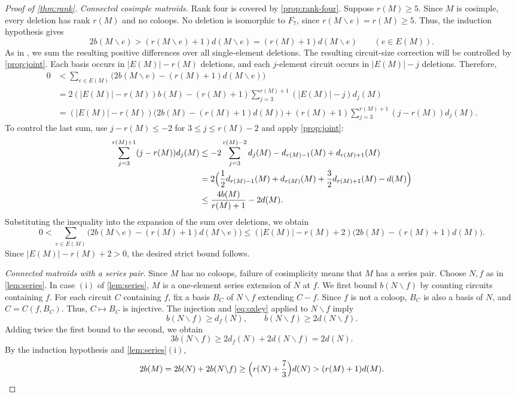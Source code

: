\documentclass[11pt]{article}
\numberwithin{equation}{section}
\begin{document}
\begin{proof}[Proof of \autoref{thm:rank}]
\emph{Connected cosimple matroids.}
Rank four is covered by \autoref{prop:rank-four}.
Suppose \(r(M)\ge5\).
Since \(M\) is cosimple, every deletion has rank \(r(M)\)
and no coloops.
No deletion is isomorphic to \(F_7\), since
\(r(M\backslash e)=r(M)\ge5\). Thus, the induction hypothesis gives
\[
 2b(M\backslash e)>(r(M\backslash e)+1)d(M\backslash e)
 =(r(M)+1)d(M\backslash e)\qquad(e\in E(M)).
\]
As in \cite[proof of Theorem~3.1, pp.~176--177]{Oxley1983},
we sum the resulting positive differences over all single-element deletions.
The resulting circuit-size correction will be controlled by
\autoref{prop:joint}.
Each basis occurs in \(|E(M)|-r(M)\) deletions, and each
\(j\)-element circuit occurs in \(|E(M)|-j\) deletions.
Therefore,
\begin{align*}
 0&<\sum_{e\in E(M)}
 \bigl(2b(M\backslash e)-(r(M)+1)d(M\backslash e)\bigr)\\
 &=2(|E(M)|-r(M))b(M)
 -(r(M)+1)\sum_{j=3}^{r(M)+1}(|E(M)|-j)d_j(M)\\
 &=(|E(M)|-r(M))\bigl(2b(M)-(r(M)+1)d(M)\bigr)+(r(M)+1)\sum_{j=3}^{r(M)+1}(j-r(M))d_j(M).
\end{align*}
To control the last sum, use \(j-r(M)\le-2\) for
\(3\le j\le r(M)-2\) and apply \autoref{prop:joint}:
\begin{align*}
 \sum_{j=3}^{r(M)+1}(j-r(M))d_j(M)
 &\le -2\sum_{j=3}^{r(M)-2}d_j(M)-d_{r(M)-1}(M)+d_{r(M)+1}(M)\\
 &=2\Bigl(\frac12d_{r(M)-1}(M)+d_{r(M)}(M)
          +\frac32d_{r(M)+1}(M)-d(M)\Bigr)\\
 &\le\frac{4b(M)}{r(M)+1}-2d(M).
\end{align*}
Substituting the inequality into the expansion of the sum over deletions, we obtain
\[
 0<\sum_{e\in E(M)}\bigl(2b(M\backslash e)-(r(M)+1)d(M\backslash e)\bigr)\le(|E(M)|-r(M)+2)\bigl(2b(M)-(r(M)+1)d(M)\bigr).
\]
Since \(|E(M)|-r(M)+2>0\), the desired strict bound follows.

\emph{Connected matroids with a series pair.}
Since \(M\) has no coloops, failure of cosimplicity means that
\(M\) has a series pair.
Choose \(N,f\) as in \autoref{lem:series}.
In case \(\mathrm{(i)}\) of \autoref{lem:series}, \(M\) is a
one-element series extension of \(N\) at \(f\).
We first bound \(b(N\backslash f)\) by counting circuits containing \(f\).
For each circuit \(C\) containing \(f\), fix a basis \(B_C\)
of \(N\backslash f\) extending \(C-f\).
Since \(f\) is not a coloop, \(B_C\) is also a basis of \(N\),
and \(C=C(f,B_C)\). Thus, \(C\mapsto B_C\) is injective.
The injection and \eqref{eq:oxley} applied to \(N\backslash f\) imply
\[
 b(N\backslash f)\ge d_f(N),\qquad
 b(N\backslash f)\ge2d(N\backslash f).
\]
Adding twice the first bound to the second, we obtain
\[
 3b(N\backslash f)\ge2d_f(N)+2d(N\backslash f)=2d(N).
\]
By the induction hypothesis and \autoref{lem:series}\(\mathrm{(i)}\),
\[
 2b(M)=2b(N)+2b(N\backslash f)
 \ge\Bigl(r(N)+\frac73\Bigr)d(N)
 >(r(M)+1)d(M).
\]


\end{proof}
\end{document}
